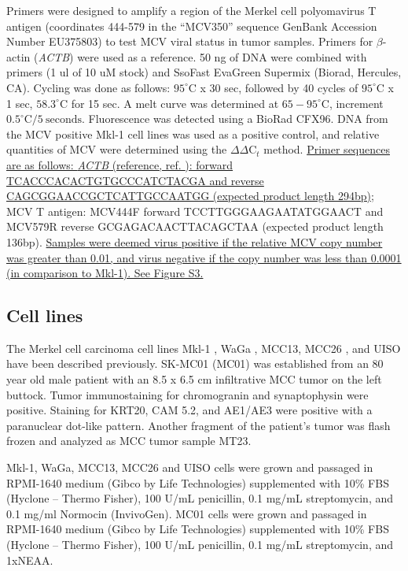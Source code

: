 \documentclass[10pt]{article}
\begin{document}
Primers were designed to amplify a  region of the Merkel cell polyomavirus T antigen (coordinates 444-579 in the ``MCV350'' sequence GenBank Accession Number EU375803) to test MCV viral status in tumor samples.
Primers for $\beta$-actin (\emph{ACTB}) were used as a reference.
50 ng of DNA were combined with primers (1 ul of 10 uM stock) and SsoFast EvaGreen Supermix (Biorad, Hercules, CA).
Cycling was done as follows: $95^{\circ}\mathrm{C}$ x 30 sec, followed by 40 cycles of $95^{\circ}\mathrm{C}$ x 1 sec, $58.3^{\circ}\mathrm{C}$ for 15 sec.
A melt curve was determined at $65-95^{\circ}\mathrm{C}$, increment $0.5^{\circ}\mathrm{C}/5\mathrm{~seconds}$.
Fluorescence was detected using a BioRad CFX96.
DNA from the MCV positive Mkl-1 cell lines was used as a positive control, and relative quantities of MCV were determined using the $\Delta\Delta\mathrm{C}_t$ method.
\uline{Primer sequences are as follows: \emph{ACTB} (reference, ref. \citep{Huang2007Expression}): forward TCACCCACACTGTGCCCATCTACGA and reverse CAGCGGAACCGCTCATTGCCAATGG (expected product length 294bp);}
MCV T antigen: MCV444F forward TCCTTGGGAAGAATATGGAACT and MCV579R reverse GCGAGACAACTTACAGCTAA (expected product length 136bp).
\uline{Samples were deemed virus positive if the relative MCV copy number was greater than 0.01, and virus negative if the copy number was less than 0.0001 (in comparison to Mkl-1).
See Figure S3.}

\subsection*{Cell lines}
The Merkel cell carcinoma cell lines Mkl-1 \citep{Rosen1987Establishment}, WaGa \citep{Houben2010Merkel}, MCC13, MCC26 \citep{Leonard1995Characterisation}, and UISO \citep{Ronan1993Merkel} have been described previously.
SK-MC01 (MC01) was established from an 80 year old male patient with an 8.5 x 6.5 cm infiltrative MCC tumor on the left buttock.
Tumor immunostaining for chromogranin and synaptophysin were positive.
Staining for KRT20, CAM 5.2, and AE1/AE3 were positive with a paranuclear dot-like pattern.
Another fragment of the patient’s tumor was flash frozen and analyzed as MCC tumor sample MT23.

Mkl-1, WaGa, MCC13, MCC26 and UISO cells were grown and passaged in RPMI-1640 medium (Gibco by Life Technologies) supplemented with 10\% FBS (Hyclone – Thermo Fisher), 100 U/mL penicillin, 0.1 mg/mL streptomycin, and 0.1 mg/ml Normocin (InvivoGen).
MC01 cells were grown and passaged in RPMI-1640 medium (Gibco by Life Technologies) supplemented with 10\% FBS (Hyclone – Thermo Fisher), 100 U/mL penicillin, 0.1 mg/mL streptomycin, and 1xNEAA.
\end{document}
